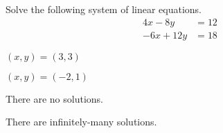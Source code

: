 \begin{readinessAssuranceTest}
\item Solve the following system of linear equations.
      \begin{align*}
      4x-8y   &= 12 \\
      -6x+12y  &=  18
      \end{align*}

\begin{multicols}{4}
\begin{readinessAssuranceTestChoices}
\item
\((x,y)=(3,3)\)
\item
\((x,y)=(-2,1)\)
\item There are no solutions.
\item There are infinitely-many solutions. %
\end{readinessAssuranceTestChoices}
\end{multicols}

\end{readinessAssuranceTest}
